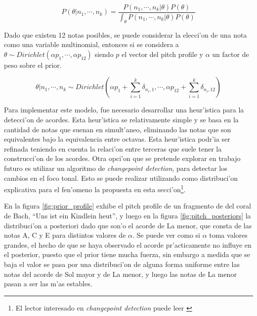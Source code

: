 $$P(\theta|n_1, \cdots, n_k) = \frac{P(n_1,\cdots, n_k | \theta) P(\theta)}{\int_{\theta}P(n_1, \cdots, n_k | \theta) P(\theta)}$$

Dado que existen 12 notas posibles, se puede considerar la elecci'on de una nota como una variable multinomial, entonces 
si se considera a $\theta \sim Dirichlet(\alpha p_1, \cdots, \alpha p_{12})$ siendo $p$ el vector del pitch profile y $\alpha$ un factor de peso sobre el prior.

$$\theta | n_1, \cdots, n_k \sim Dirichlet(\alpha p_1 + \sum_{i=1}^k \delta_{n_i,1}, \cdots, \alpha p_{12} + \sum_{i=1}^k \delta_{n_i,12})$$

Para implementar este modelo, fue necesario desarrollar una heur'istica para la detecci'on de acordes. Esta heur'istica se relativamente simple y se basa en la cantidad de notas
que suenan en simult'aneo, eliminando las notas que son equivalentes bajo la equivalencia entre octavas. Esta heur'istica podr'ia ser refinada teniendo en cuenta la relaci'on entre
terceras que suele tener la construcci'on de los acordes. Otra opci'on que se pretende explorar en trabajo futuro es utilizar un algoritmo de \emph{changepoint detection}, para
detectar los cambios en el foco tonal. Esto se puede realizar utilizando como distribuci'on explicativa para el fen'omeno la propuesta en esta secci'on\footnote{El lector interesado en \emph{changepoint detection} puede leer \cite{adams-mackay-2007}}.

En la figura \ref{fig:prior_profile} exhibe el pitch profile de un fragmento de del coral de Bach,  ``Uns ist ein Kindlein heut'', y luego en la figura \ref{fig:pitch_posteriors}
la distribuci'on a posteriori dado que son'o el acorde de La menor, que consta de las notas A, C y E para distintos valores de $\alpha$. 
Se puede ver como si $\alpha$ toma valores grandes, el hecho
de que se haya observado el acorde pr'acticamente no influye en el posterior, puesto que el prior tiene mucha fuerza, sin embargo a medida que se baja el valor se pasa por una 
distribuci'on de alguna forma uniforme entre las notas del acorde de Sol mayor y de La menor, y luego las notas de La menor pasan a ser las m'as estables.

\begin{imagen}
    \width{10cm}
\end{imagen}

